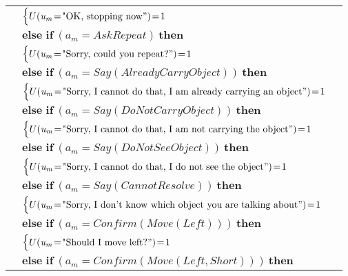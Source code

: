 \begin{footnotesize}
\begin{longtable}{p{2cm}l}
& \;\;\;\;\; $ \begin{cases}U(\mathit{u_m}\!=\!\text{"OK, stopping now}")\!=\!1 \end{cases}$\\[3mm] & $ \textbf{else if} \ (\mathit{a_m}\!=\!\mathit{AskRepeat}) \ \textbf{then}$ \\
& \;\;\;\;\; $ \begin{cases}U(\mathit{u_m}\!=\!\text{"Sorry, could you repeat?}")\!=\!1 \end{cases}$\\[3mm] & $ \textbf{else if} \ (\mathit{a_m}\!=\!\mathit{Say(AlreadyCarryObject)}) \ \textbf{then}$ \\
& \;\;\;\;\; $ \begin{cases}U(\mathit{u_m}\!=\!\text{"Sorry, I cannot do that, I am already carrying an object}")\!=\!1 \end{cases}$\\[3mm] & $ \textbf{else if} \ (\mathit{a_m}\!=\!\mathit{Say(DoNotCarryObject)}) \ \textbf{then}$ \\
& \;\;\;\;\; $ \begin{cases}U(\mathit{u_m}\!=\!\text{"Sorry, I cannot do that, I am not carrying the object}")\!=\!1 \end{cases}$\\[3mm] & $ \textbf{else if} \ (\mathit{a_m}\!=\!\mathit{Say(DoNotSeeObject)}) \ \textbf{then}$ \\
& \;\;\;\;\; $ \begin{cases}U(\mathit{u_m}\!=\!\text{"Sorry, I cannot do that, I do not see the object}")\!=\!1 \end{cases}$\\[3mm] & $ \textbf{else if} \ (\mathit{a_m}\!=\!\mathit{Say(CannotResolve)}) \ \textbf{then}$ \\
& \;\;\;\;\; $ \begin{cases}U(\mathit{u_m}\!=\!\text{"Sorry, I don't know which object you are talking about}")\!=\!1 \end{cases}$\\[3mm] & $ \textbf{else if} \ (\mathit{a_m}\!=\!\mathit{Confirm(Move(Left))}) \ \textbf{then}$ \\
& \;\;\;\;\; $ \begin{cases}U(\mathit{u_m}\!=\!\text{"Should I move left?}")\!=\!1 \end{cases}$\\[3mm] & $ \textbf{else if} \ (\mathit{a_m}\!=\!\mathit{Confirm(Move(Left,Short))}) \ \textbf{then}$ \\

\end{longtable}
\end{footnotesize}
